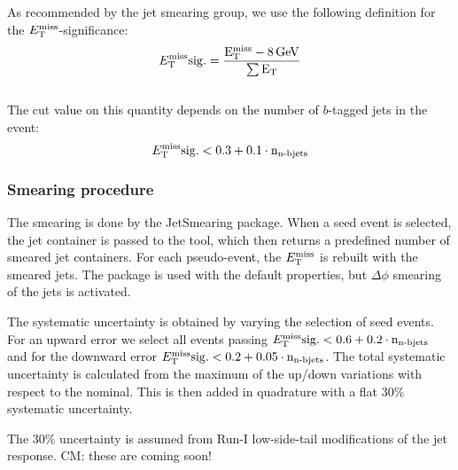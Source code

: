  As recommended by the jet smearing group, we use the following definition
 for the $E_{\mathrm{T}}^{\mathrm{miss}}$-significance: $$E_{\mathrm{T}}^{\mathrm{miss}}\rm{sig.}=\frac{ E_{\mathrm{T}}^{\mathrm{miss}}-8\rm{\,GeV} } {\sum E_\mathrm{T} } $$\\
 The cut value on this quantity depends on the number of $b$-tagged jets in the event:
$$E_{\mathrm{T}}^{\mathrm{miss}}\rm{sig.} < 0.3 + 0.1\cdot n_{\textup{n-bjets}}$$


 \subsubsection{Smearing procedure}

 The smearing is done by the JetSmearing package. When a seed event is selected,
 the jet container is passed to the tool, which then returns a predefined number
 of smeared jet containers. For each pseudo-event, the $E_{\mathrm{T}}^{\mathrm{miss}}$ is rebuilt with
 the smeared jets.\newline
 The package is used with the default properties, but $\Delta\phi$ smearing of the jets is activated.

 The systematic uncertainty is obtained by varying the selection of seed events. For an upward error we select all events passing $E_{\mathrm{T}}^{\mathrm{miss}}\rm{sig.} <  0.6 + 0.2\cdot n_{\textup{n-bjets}}$ and for the downward error $E_{\mathrm{T}}^{\mathrm{miss}}\rm{sig.} < 0.2 + 0.05\cdot n_{\textup{n-bjets}}$. The total systematic uncertainty is calculated from the maximum of the up/down variations with respect to the nominal. This is then added in quadrature with a flat 30\% systematic uncertainty.

The 30\% uncertainty is assumed from Run-I low-side-tail modifications of the jet response. {\color{red} CM: these are coming soon!}\\



